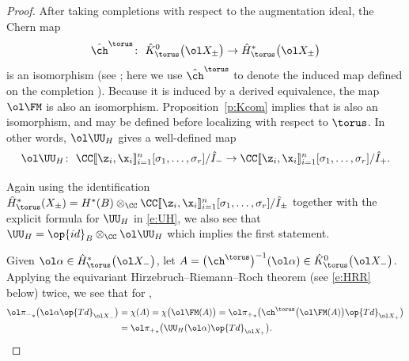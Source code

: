 \begin{proof}
After taking completions with respect to the augmentation ideal, the Chern map
\[
\hat{\ch}^\torus\colon \ \hat K^0_\torus\bigl(\ol X_\pm\bigr) \to \hat H^*_\torus\bigl(\ol X_\pm\bigr)
\]
is an isomorphism \big(see \cite{EG}; here we use $\hat{\ch}^\torus$ to denote the induced map defined on the completion \big). Because it is induced by a derived equivalence, the map $\ol \FM$ is also an isomorphism.
Proposition~\ref{p:Kcom} implies that 
is also an
isomorphism, and may be defined before localizing with respect to $\torus$. In other words, $\ol \UU_H$ gives a well-defined map
\[
\ol \UU_H\colon \ \CC[\![\z_i, \x_i]\!]_{i=1}^n[\sigma_1, \dots, \sigma_r]/\hat I_- \to \CC[\![\z_i, \x_i]\!]_{i=1}^n[\sigma_1, \dots, \sigma_r]/\hat I_+.
\]


Again using the identification
$ \hat H^*_\torus(X_{\pm}) = H^*(B) \otimes_\CC \CC[\![\z_i, \x_i]\!]_{i=1}^n[\sigma_1, \dots, \sigma_r]/\hat I_\pm$
together with the explicit formula for $\UU_H$ in \eqref{e:UH}, we also see that $\UU_H = \op{id}_B \otimes_\CC \ol \UU_H$ which implies the first statement.


Given $\ol \alpha \in \hat H^*_\torus\bigl(\ol X_-\bigr)$, let $A = \bigl(\ch^\torus\bigr)^{-1}(\ol \alpha) \in \hat K^0_\torus\bigl(\ol X_-\bigr)$. Applying the equivariant Hirzebruch--Riemann--Roch theorem (see \eqref{e:HRR} below) twice, we see that for ,
\begin{align}
{\ol \pi_-}_* \bigl(\ol \alpha \op{Td}_{\ol X_-} \bigr)& = \chi(A)
 = \chi\bigl(\ol \FM (A)\bigr)
 = {\ol \pi_+}_* \bigl(\ch^\torus\bigl(\ol \FM (A)\bigr) \op{Td}_{\ol X_+}\bigr) \nonumber \\
 & = {\ol \pi_+}_* \bigl(\UU_H (\ol \alpha) \op{Td}_{\ol X_+}\bigr). \label{UC}
 \end{align}


\end{proof}
